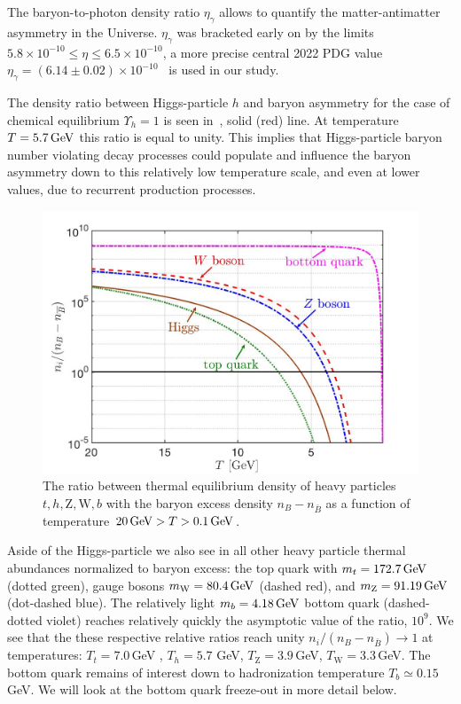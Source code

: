 {\color{black}The baryon-to-photon density ratio $\eta_\gamma$ allows to quantify the matter-antimatter asymmetry in the Universe. $\eta_\gamma$ was bracketed early on  by the limits $5.8\times10^{-10} \leqslant\eta\leqslant6.5\times10^{-10}$, a more precise central 2022 PDG value $\eta_\gamma=(6.14\pm0.02)\times10^{-10}$~\cite{ParticleDataGroup:2022pth} is used in our study.} 

{\color{black}The density ratio between Higgs-particle $h$ and baryon asymmetry for the case of chemical equilibrium $\Upsilon_h=1$ is seen in~, solid (red) line. At temperature $T=5.7\text{\,GeV}$ this ratio is equal to unity. This implies that Higgs-particle baryon number violating decay processes could populate and influence the baryon asymmetry down to this relatively low temperature scale, and even at lower values, due to recurrent production processes.} 

\begin{figure}
\centerline{\includegraphics[width=0.85\linewidth]{./plots/ni_over_nb_vs_T-new.jpg}}
\caption{{\color{black} The ratio between thermal equilibrium density of heavy particles $t,h, \mathrm{Z,W}, b$ with the baryon excess density $n_B-n_{\bar B}$ as a function of temperature $20\text{\,GeV}>T>0.1\text{\,GeV}$. 
}}
\label{HiggsDensity:fig} 
\end{figure}

{\color{black}Aside of the Higgs-particle we also see in  all other heavy particle thermal abundances normalized to baryon excess: the top quark with $m_t=172.7\text{\,GeV}$ (dotted green), gauge bosons $m_\mathrm{W}=80.4\text{\,GeV}$ (dashed red), and $m_\mathrm{Z}=91.19\text{\,GeV}$ (dot-dashed blue). The relatively light $m_b=4.18\text{\,GeV}$ bottom quark (dashed-dotted violet) reaches relatively quickly the asymptotic value of the ratio, $10^{9}$. We see that the these respective relative ratios reach unity $n_i/(n_B-n_{\bar{B}})\to 1$ at temperatures: $T_t=7.0$\,GeV , $T_h=5.7$ GeV, $T_\mathrm{Z}=3.9$\,GeV, $T_\mathrm{W}=3.3$\,GeV. The bottom quark remains of interest down to hadronization temperature $T_b\simeq 0.15$\,GeV. We will look at the bottom quark freeze-out in more detail below.}

